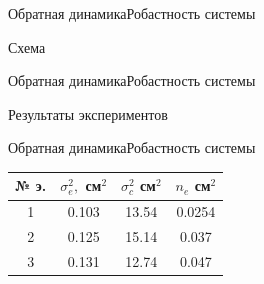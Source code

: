 \begin{frame}{Обратная динамика}{Робастность системы}
    \begin{block}{Схема}
    \end{block}
\end{frame}

\begin{frame}{Обратная динамика}{Робастность системы}
    \begin{block}{Результаты экспериментов}
    \end{block}
\end{frame}

\begin{frame}{Обратная динамика}{Робастность системы}

\begin{table}[H]
    \begin{tabular}{|c|c|c|c|}
        \hline 
        № э.& $\sigma^2_e,$ см$^2$ & $\sigma^2_c$ см$^2$ & $n_e$ см$^2$ \\ \hline 
        1& 0.103 & 13.54 & 0.0254\\ \hline
        2& 0.125 & 15.14  & 0.037 \\ \hline
        3& 0.131 & 12.74 & 0.047\\ \hline

    \end{tabular}
\end{table}
\end{frame}
 
